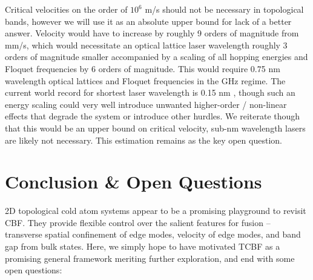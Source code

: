 \documentclass[onecolumn,
               superscriptaddress,
               floatfix,
               longbibliography, 
               showkeys,apl]{revtex4-2}
\begin{document}
Critical velocities on the order of $10^6$ m/s should not be necessary in topological bands, however we will use it as an absolute upper bound for lack of a better answer. Velocity would have to increase by roughly 9 orders of magnitude from mm/s, which would necessitate an optical lattice laser wavelength roughly 3 orders of magnitude smaller accompanied by a scaling of all hopping energies and Floquet frequencies by 6 orders of magnitude. This would require 0.75 nm wavelength optical lattices and Floquet frequencies in the GHz regime. The current world record for shortest laser wavelength is 0.15 nm \cite{Yoneda2015}, though such an energy scaling could very well introduce unwanted higher-order / non-linear effects that degrade the system or introduce other hurdles. We reiterate though that this would be an upper bound on critical velocity, sub-nm wavelength lasers are likely not necessary. This estimation remains as the key open question.


\section{Conclusion \& Open Questions}\label{sec:conclusion}

2D topological cold atom systems appear to be a promising playground to revisit CBF. They provide flexible control over the salient features for fusion -- transverse spatial confinement of edge modes, velocity of edge modes, and band gap from bulk states. Here, we simply hope to have motivated TCBF as a promising general framework meriting further exploration, and end with some open questions:
\end{document}
